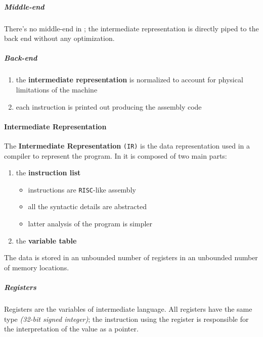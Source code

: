 \documentclass[english]{article}
\begin{document}
\subparagraph*{Middle-end}
There's no middle-end in \acse; the intermediate representation is directly piped to the back end without any optimization.

\subparagraph*{Back-end}
\begin{enumerate}
  \item the \textbf{intermediate representation} is normalized to account for physical limitations of the \mace machine
  \item each instruction is printed out producing the \mace assembly code
\end{enumerate}

\paragraph{Intermediate Representation}

The \textbf{Intermediate Representation} \texttt{(IR)} is the data representation used in a compiler to represent the program.
In \acse it is composed of two main parts:

\begin{enumerate}
  \item the \textbf{instruction list}
        \begin{itemize}[label=\textbf{\texttt{>}}]
          \item instructions are \texttt{RISC}-like assembly
          \item all the syntactic details are abstracted
          \item latter analysis of the program is simpler
        \end{itemize}
  \item the \textbf{variable table}
\end{enumerate}

The data is stored in an unbounded number of registers in an unbounded number of memory locations.

\subparagraph*{Registers}
Registers are the variables of intermediate language.
All registers have the same type \textit{(32-bit signed integer)}; the instruction using the register is responsible for the interpretation of the value as a pointer.
\end{document}
